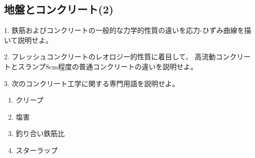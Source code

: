 \subsection{地盤とコンクリート(2)}

1.
鉄筋およびコンクリートの一般的な力学的性質の違いを応力-ひずみ曲線を描いて説明せよ。

2.
フレッシュコンクリートのレオロジー的性質に着目して、
高流動コンクリートとスランプ8cm程度の普通コンクリートの違いを説明せよ。

3.
次のコンクリート工学に関する専門用語を説明せよ。
\begin{enumerate}
  \item クリープ
  \item 塩害
  \item 釣り合い鉄筋比
  \item スターラップ
\end{enumerate}
